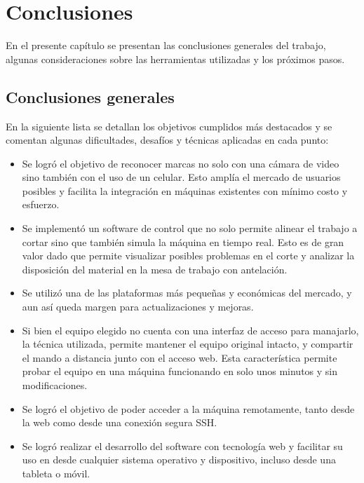 \chapter{Conclusiones}
\label{Chapter5}
En el presente capítulo se presentan las conclusiones generales del trabajo, algunas consideraciones sobre las herramientas utilizadas y los próximos pasos.

\section{Conclusiones generales }

En la siguiente lista se detallan los objetivos cumplidos más destacados y se comentan algunas dificultades, desafíos y técnicas aplicadas en cada punto:

\begin{itemize}
   \item{Se logró el objetivo de reconocer marcas no solo con una cámara de video sino también con el uso de un celular. Esto amplía el mercado de usuarios posibles y facilita la integración en máquinas existentes con mínimo costo y esfuerzo.}

   \item{Se implementó un software de control que no solo permite alinear el trabajo a cortar sino que también simula la máquina en tiempo real. Esto es de gran valor dado que permite visualizar posibles problemas en el corte y analizar la disposición del material en la mesa de trabajo con antelación.}

   \item{Se utilizó una de las plataformas más pequeñas y económicas del mercado, y aun así queda margen para actualizaciones y mejoras.}

   \item{Si bien el equipo elegido no cuenta con una interfaz de acceso para manajarlo, la técnica utilizada, permite mantener el equipo original intacto, y compartir el mando a distancia junto con el acceso web. Esta característica permite probar el equipo en una máquina funcionando en solo unos minutos y sin modificaciones.}

   \item{Se logró el objetivo de poder acceder a la máquina remotamente, tanto desde la web como desde una conexión segura SSH.}

   \item{Se logró realizar el desarrollo del software con tecnología web y facilitar su uso en desde cualquier sistema operativo y dispositivo, incluso desde una tableta o móvil.}


\end{itemize}
